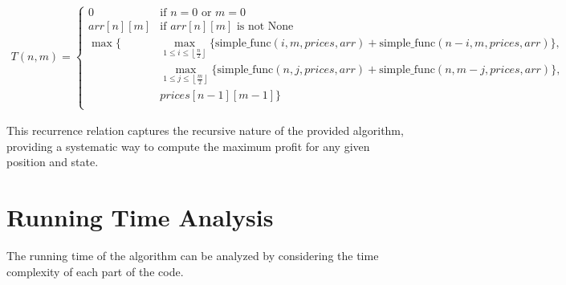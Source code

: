 \documentclass{article}
\begin{document}
\begin{align*}
T(n, m) = \begin{cases} 
0 & \text{if } n = 0 \text{ or } m = 0 \\
arr[n][m] & \text{if } arr[n][m] \text{ is not None} \\
\max \Biggl\{ 
& \max \limits_{1 \leq i \leq \left\lfloor \frac{n}{2} \right\rfloor} \{ \text{simple\_func}(i, m, prices, arr) + \text{simple\_func}(n - i, m, prices, arr) \}, \\
& \max \limits_{1 \leq j \leq \left\lfloor \frac{m}{2} \right\rfloor} \{ \text{simple\_func}(n, j, prices, arr) + \text{simple\_func}(n, m - j, prices, arr) \}, \\
& prices[n - 1][m - 1] 
\Biggr\} \\
\end{cases} 
\end{align*}


This recurrence relation captures the recursive nature of the provided algorithm, providing a systematic way to compute the maximum profit for any given position and state.



\section{Running Time Analysis}

The running time of the algorithm can be analyzed by considering the time complexity of each part of the code.
\end{document}
